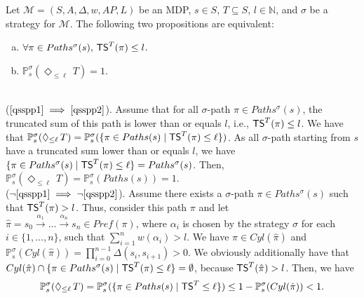 \begin{theorem} \label{spg-thm1}
  Let $\mathcal{M}=(S, A, \Delta, w, AP, L)$ be an MDP, $s \in S$, $T \subseteq S$, $l \in \mathbb{N}$, and $\sigma$ be a strategy for $\mathcal{M}$.
  The following two propositions are equivalent:
  \begin{enumerate}[(a)]
    \item $\forall \pi \in Paths^\sigma(s), \, \text{\sffamily TS}^T(\pi) \leq l$. \label{qsspp1}
    \item $\mathbb{P}_s^\sigma(\Diamond_{\leq \ell}\, T) = 1$. \label{qsspp2}
  \end{enumerate}
\end{theorem}
\begin{proof2}$ $\\
  ($\ref{qsspp1}\implies\ref{qsspp2}$). Assume that for all $\sigma$-path $\pi \in Paths^\sigma(s)$, the truncated sum of this path is lower than or equals $l$, i.e., $\text{\sffamily TS}^T(\pi)\leq l$.
  We have that $\mathbb{P}_s^\sigma(\Diamond_{\leq \ell}\, T) = \mathbb{P}_s^\sigma(\{ \pi \in Paths(s) \; | \; \text{\sffamily TS}^T(\pi) \leq \ell \})$. As all $\sigma$-path starting from $s$ have a truncated sum lower than or equals $l$, we have $\{\pi \in Paths^\sigma(s) \; | \; \text{\sffamily TS}^T(\pi) \leq \ell \} = Paths^\sigma(s)$.
  Then, $\mathbb{P}_s^\sigma(\Diamond_{\leq \ell}\, T) = \mathbb{P}_s^\sigma(Paths(s)) = 1$. \\
  ($\neg \ref{qsspp1} \implies \neg \ref{qsspp2}$). Assume there exists a $\sigma$-path $\pi \in Paths^\sigma(s)$ such that $\text{\sffamily TS}^T(\pi)>l$. Thus, consider this path $\pi$ and let $\hat{\pi} = s_0\xrightarrow{\alpha_1}\dots \xrightarrow{\alpha_n} s_n \in Pref(\pi)$, where $\alpha_i$ is
  chosen by the strategy $\sigma$ for each $i \in \{1, \dots, n \}$, such that $\sum_{i=1}^n w(\alpha_i) > l$.
  We have $\pi \in Cyl(\hat{\pi})$ and $\mathbb{P}_s^\sigma(Cyl(\hat{\pi})) = \prod_{i=0}^{n-1} \Delta(s_i, s_{i+1}) > 0$.
  We obviously additionally have that $Cyl(\hat{\pi}) \cap \{ \pi \in Paths^\sigma(s) \; | \; \text{\sffamily TS}^T(\pi) \leq \ell \} = \emptyset$, because %
  $\text{\sffamily TS}^T(\hat{\pi}) > l$.
  Then, we have
   \[\mathbb{P}_s^\sigma(\Diamond_{\leq \ell}\, T) = \mathbb{P}_s^\sigma(\{ \pi \in Paths(s) \; | \; \text{\sffamily TS}^T \leq \ell \}) \leq 1 - \mathbb{P}_s^\sigma(Cyl(\hat{\pi})) < 1.\]
\end{proof2}
\\

